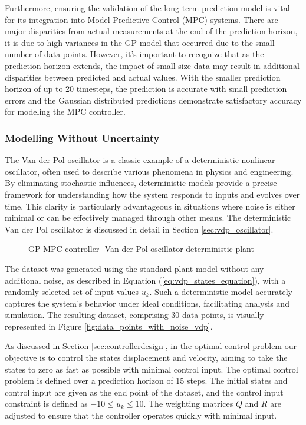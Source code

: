 Furthermore, ensuring the validation of the long-term prediction model is vital for its integration into Model Predictive Control (MPC) systems. There are major disparities from actual measurements at the end of the prediction horizon, it is due to high variances in the GP model that occurred due to the small number of data points. However, it's important to recognize that as the prediction horizon extends, the impact of small-size data may result in additional disparities between predicted and actual values. With the smaller prediction horizon of up to 20 timesteps, the prediction is accurate with small prediction errors and the Gaussian distributed predictions demonstrate satisfactory accuracy for modeling the MPC controller.



\subsubsection{Modelling Without Uncertainty}
The Van der Pol oscillator is a classic example of a deterministic nonlinear oscillator, often used to describe various phenomena in physics and engineering. By eliminating stochastic influences, deterministic models provide a precise framework for understanding how the system responds to inputs and evolves over time. This clarity is particularly advantageous in situations where noise is either minimal or can be effectively managed through other means. The deterministic Van der Pol oscillator is discussed in detail in Section \ref{sec:vdp_oscillator}.

\begin{figure}
    \centering
    
    \caption{GP-MPC controller- Van der Pol oscillator deterministic plant}
    \label{fig:Gp-mpc_noise_vdp}
\end{figure}

The dataset was generated using the standard plant model without any additional noise, as described in Equation (\ref{eq:vdp_states_equation}), with a randomly selected set of input values $u_k$. Such a deterministic model accurately captures the system's behavior under ideal conditions, facilitating analysis and simulation. The resulting dataset, comprising 30 data points, is visually represented in Figure \ref{fig:data_points_with_noise_vdp}. 

As discussed in Section \ref{sec:controllerdesign}, in the optimal control problem our objective is to control the states displacement and velocity, aiming to take the states to zero as fast as possible with minimal control input. The optimal control problem is defined over a prediction horizon of 15 steps. The initial states and control input are given as the end point of the dataset, and the control input constraint is defined as $-10 \leq u_k \leq 10$. The weighting matrices $Q$ and $R$ are adjusted to ensure that the controller operates quickly with minimal input.

